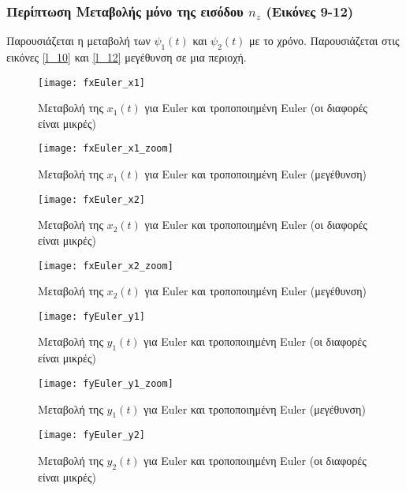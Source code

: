 \documentclass{article}
\begin{document}
\subsubsection{Περίπτωση Μεταβολής μόνο της εισόδου \(n_z\) (Εικόνες 9-12)}
Παρουσιάζεται η μεταβολή των \(\psi_1(t)\) και \(\psi_2(t)\) με το χρόνο. Παρουσιάζεται στις εικόνες \ref{l_10} και \ref{l_12} μεγέθυνση σε μια περιοχή.
\clearpage

\begin{figure}[bh!]
 \centering
\texttt{[image: fxEuler\_x1]}
\caption{Μεταβολή της $x_1(t)$ για Euler και τροποποιημένη
 Euler (οι διαφορές είναι μικρές)}
\end{figure}

\begin{figure}[h!]
 \centering
\texttt{[image: fxEuler\_x1\_zoom]}
\caption{Μεταβολή της $x_1(t)$ για Euler και τροποποιημένη Euler (μεγέθυνση)}
\label{l_2}
\end{figure}
\clearpage

\clearpage
\begin{figure}[h!]
 \centering
\texttt{[image: fxEuler\_x2]}
\caption{Μεταβολή της $x_2(t)$ για Euler και τροποποιημένη Euler (οι διαφορές είναι μικρές)}
\end{figure}


\begin{figure}[h!]
 \centering
\texttt{[image: fxEuler\_x2\_zoom]}
\caption{Μεταβολή της $x_2(t)$ για Euler και τροποποιημένη Euler (μεγέθυνση)}
\label{l_4}
\end{figure}
\clearpage

\clearpage
\begin{figure}[h!]
 \centering
\texttt{[image: fyEuler\_y1]}
\caption{Μεταβολή της $y_1(t)$ για Euler και τροποποιημένη
 Euler (οι διαφορές είναι μικρές)}
\end{figure}

\begin{figure}[h!]
 \centering
\texttt{[image: fyEuler\_y1\_zoom]}
\caption{Μεταβολή της $y_1(t)$ για Euler και τροποποιημένη Euler (μεγέθυνση)}
\label{l_6}
\end{figure}
\clearpage

\clearpage
\begin{figure}[h!]
\centering
\texttt{[image: fyEuler\_y2]}
\caption{Μεταβολή της $y_2(t)$ για Euler και τροποποιημένη Euler (οι διαφορές είναι μικρές)}
\end{figure}
\end{document}

